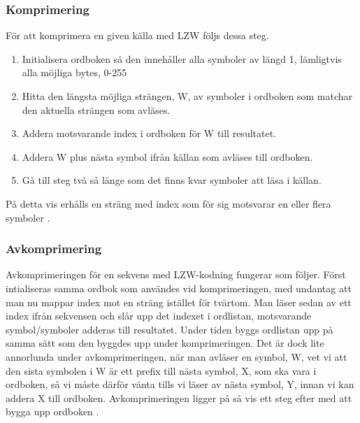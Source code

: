 	\subsubsection{Komprimering}
	För att komprimera en given källa med LZW följs dessa steg.
	\begin{enumerate}
	\item Initialisera ordboken så den innehåller alla symboler av längd 1, lämligtvis alla möjliga bytes, 0-255
	\item Hitta den längsta möjliga strängen, W, av symboler i ordboken som matchar den aktuella strängen som avläses.
	\item Addera motsvarande index i ordboken för W till resultatet. 
	\item Addera W plus nästa symbol ifrån källan som avläses till ordboken.
	\item Gå till steg två så länge som det finns kvar symboler att läsa i källan.
	\end{enumerate}
	
	\noindent På detta vis erhålls en sträng med index som för sig motsvarar en eller flera symboler \cite{lempelzivwelch2018}.
 
	\subsubsection{Avkomprimering}
	Avkomprimeringen för en sekvens med LZW-kodning fungerar som följer. Först intialiseras samma ordbok som användes vid komprimeringen, med undantag att man nu mappar index mot en sträng istället för tvärtom. Man läser sedan av ett index ifrån sekvensen och slår upp det indexet i ordlistan, motsvarande symbol/symboler adderas till resultatet. Under tiden byggs ordlistan upp på samma sätt som den byggdes upp under komprimeringen. Det är dock lite annorlunda under avkomprimeringen, när man avläser en symbol, W, vet vi att den sista symbolen i W är ett prefix till nästa symbol, X, som ska vara i ordboken, så vi måste därför vänta tills vi läser av nästa symbol, Y, innan vi kan addera X till ordboken. Avkomprimeringen ligger på så vis ett steg efter med att bygga upp ordboken \cite{lempelzivwelch2018}.
	

